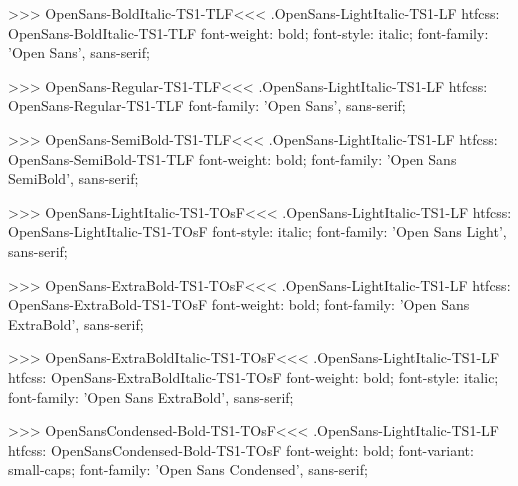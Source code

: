 >>>
\<OpenSans-BoldItalic-TS1-TLF\><<<
.OpenSans-LightItalic-TS1-LF
htfcss:  OpenSans-BoldItalic-TS1-TLF  font-weight: bold; font-style: italic; font-family: 'Open Sans', sans-serif;

>>>
\<OpenSans-Regular-TS1-TLF\><<<
.OpenSans-LightItalic-TS1-LF
htfcss:  OpenSans-Regular-TS1-TLF  font-family: 'Open Sans', sans-serif;

>>>
\<OpenSans-SemiBold-TS1-TLF\><<<
.OpenSans-LightItalic-TS1-LF
htfcss:  OpenSans-SemiBold-TS1-TLF  font-weight: bold; font-family: 'Open Sans SemiBold', sans-serif;

>>>
\<OpenSans-LightItalic-TS1-TOsF\><<<
.OpenSans-LightItalic-TS1-LF
htfcss:  OpenSans-LightItalic-TS1-TOsF  font-style: italic; font-family: 'Open Sans Light', sans-serif;

>>>
\<OpenSans-ExtraBold-TS1-TOsF\><<<
.OpenSans-LightItalic-TS1-LF
htfcss:  OpenSans-ExtraBold-TS1-TOsF  font-weight: bold; font-family: 'Open Sans ExtraBold', sans-serif;

>>>
\<OpenSans-ExtraBoldItalic-TS1-TOsF\><<<
.OpenSans-LightItalic-TS1-LF
htfcss:  OpenSans-ExtraBoldItalic-TS1-TOsF  font-weight: bold; font-style: italic; font-family: 'Open Sans ExtraBold', sans-serif;

>>>
\<OpenSansCondensed-Bold-TS1-TOsF\><<<
.OpenSans-LightItalic-TS1-LF
htfcss:  OpenSansCondensed-Bold-TS1-TOsF  font-weight: bold; font-variant: small-caps; font-family: 'Open Sans Condensed', sans-serif;

